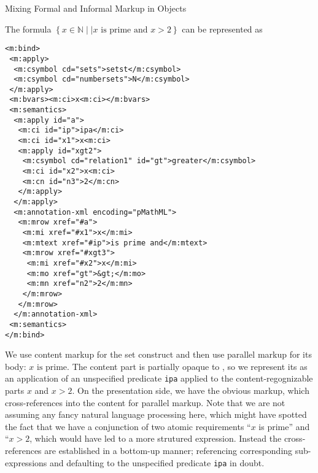 \begin{omgroup}{Mixing Formal and Informal Markup in Objects}
\begin{example}
  The formula $\left\{x\in\mathbb{N}\mid|\text{$x$ is prime and $x>2$}\right\}$ can be represented
  as
\begin{lstlisting}[language=MathML]
<m:bind>
 <m:apply> 
  <m:csymbol cd="sets">setst</m:csymbol>
  <m:csymbol cd="numbersets">N</m:csymbol>
 </m:apply>
 <m:bvars><m:ci>x<m:ci></m:bvars>
 <m:semantics>
  <m:apply id="a">
   <m:ci id="ip">ipa</m:ci>
   <m:ci id="x1">x<m:ci>
   <m:apply id="xgt2">
    <m:csymbol cd="relation1" id="gt">greater</m:csymbol>
    <m:ci id="x2">x<m:ci>
    <m:cn id="n3">2</m:cn>
   </m:apply>
  </m:apply>
  <m:annotation-xml encoding="pMathML">
   <m:mrow xref="#a">
    <m:mi xref="#x1">x</m:mi>
    <m:mtext xref="#ip">is prime and</m:mtext>
    <m:mrow xref="#xgt3">
     <m:mi xref="#x2">x</m:mi>
     <m:mo xref="gt">&gt;</m:mo>
     <m:mn xref="n2">2</m:mn>
    </m:mrow>
   </m:mrow>
  </m:annotation-xml>
 <m:semantics>
</m:bind>
\end{lstlisting}
  We use content markup for the set construct and then use parallel markup for its body:
  $\text{$x$ is prime}$. The content part is partially opaque to \cmathml{}, so we represent its as an application of an unspecified
  predicate \lstinline|ipa| applied to the content-regognizable parts $x$ and $x>2$. On
  the presentation side, we have the obvious markup, which cross-references into the
  content for parallel markup. Note that we are not assuming any fancy natural language
  processing here, which might have spotted the fact that we have a conjunction of two
  atomic requirements ``$x$ is prime'' and ``$x>2$, which would have led to a more
  strutured \cmathml expression. Instead the cross-references are established in a
  bottom-up manner; referencing corresponding sub-expressions and defaulting to the
  unspecified predicate \lstinline|ipa| in doubt.
 \end{example}
\end{omgroup}

